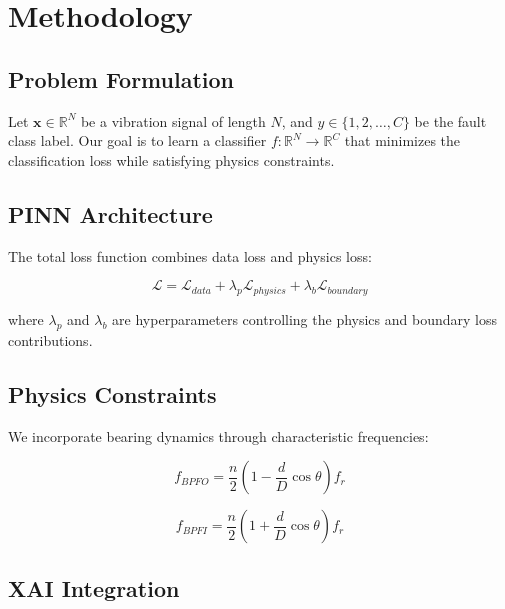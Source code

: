 \documentclass[journal]{IEEEtran}
\begin{document}
\section{Methodology}
\label{sec:methodology}

\subsection{Problem Formulation}

Let $\mathbf{x} \in \mathbb{R}^{N}$ be a vibration signal of length $N$,
and $y \in \{1, 2, \ldots, C\}$ be the fault class label. Our goal is to
learn a classifier $f: \mathbb{R}^{N} \rightarrow \mathbb{R}^{C}$ that
minimizes the classification loss while satisfying physics constraints.

\subsection{PINN Architecture}

The total loss function combines data loss and physics loss:

\begin{equation}
    \mathcal{L} = \mathcal{L}_{data} + \lambda_p \mathcal{L}_{physics} + \lambda_b \mathcal{L}_{boundary}
\end{equation}

where $\lambda_p$ and $\lambda_b$ are hyperparameters controlling the
physics and boundary loss contributions.

\subsection{Physics Constraints}

We incorporate bearing dynamics through characteristic frequencies:

\begin{equation}
    f_{BPFO} = \frac{n}{2} \left(1 - \frac{d}{D}\cos\theta\right) f_r
\end{equation}

\begin{equation}
    f_{BPFI} = \frac{n}{2} \left(1 + \frac{d}{D}\cos\theta\right) f_r
\end{equation}

\subsection{XAI Integration}
\end{document}
